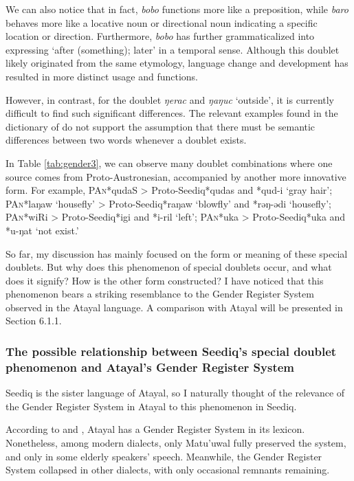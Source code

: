 \documentclass[12pt]{article}
\newcommand{\pan}{\textsc{PAn}\xspace}
\newcommand{\panf}{Proto-Austronesian\xspace}
\newcommand{\psedf}{Proto-Seediq\xspace}
\begin{document}
We can also notice that in fact, \textit{bobo} functions more like a preposition, while \textit{baro} behaves more like a locative noun or directional noun indicating a specific location or direction. Furthermore, \textit{bobo} has further grammaticalized into expressing `after (something); later' in a temporal sense. Although this doublet likely originated from the same etymology, language change and development has resulted in more distinct usage and functions.

However, in contrast, for the doublet \textit{ŋerac} and \textit{ŋaŋuc} `outside', it is currently difficult to find such significant differences. The relevant examples found in the dictionary of \textcite{ILRDFEdict} do not support the assumption that there must be semantic differences between two words whenever a doublet exists.

In Table \ref{tab:gender3}, we can observe many doublet combinations where one source comes from \panf, accompanied by another more innovative form. For example, \pan *qudaS > \psedf *qudas and *qud-i `gray hair'; \pan *laŋaw `housefly' > \psedf *raŋaw `blowfly' and *rəŋ-ədi `housefly'; \pan *wiRi > \psedf *igi and *i-ril `left'; \pan *uka > \psedf *uka and *u-ŋat `not exist.'

So far, my discussion has mainly focused on the form or meaning of these special doublets. But why does this phenomenon of special doublets occur, and what does it signify? How is the other form constructed? I have noticed that this phenomenon bears a striking resemblance to the Gender Register System observed in the Atayal language. A comparison with Atayal will be presented in Section 6.1.1.

\subsubsection{The possible relationship between Seediq's special doublet phenomenon and Atayal's Gender Register System}

Seediq is the sister language of Atayal, so I naturally thought of the relevance of the Gender Register System in Atayal to this phenomenon in Seediq.

According to \textcite{li1980gender,li1982gender,li1983gender} and \textcite{goderich2020phd}, Atayal has a Gender Register System in its lexicon. Nonetheless, among modern dialects, only Matu'uwal fully preserved the system, and only in some elderly speakers' speech. Meanwhile, the Gender Register System collapsed in other dialects, with only occasional remnants remaining.
\end{document}

